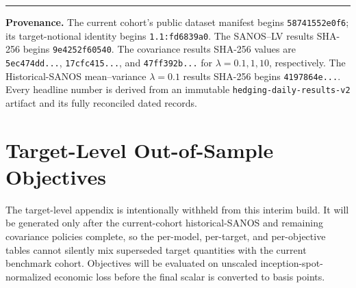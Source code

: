 \documentclass[10pt]{article}
\begin{document}
\vspace{0.4em}
\hrule
\vspace{0.35em}
{\footnotesize
\textbf{Provenance.}
The current cohort's public dataset manifest begins \texttt{58741552e0f6};
its target-notional identity begins \texttt{1.1:fd6839a0}. The SANOS--LV
results SHA-256 begins \texttt{9e4252f60540}.
The covariance results SHA-256 values are
\texttt{5ec474dd...}, \texttt{17cfc415...}, and \texttt{47ff392b...} for
$\lambda=0.1,1,10$, respectively. The Historical-SANOS mean--variance
$\lambda=0.1$ results SHA-256 begins \texttt{4197864e...}. Every headline number is derived from an
immutable \texttt{hedging-daily-results-v2} artifact and its fully reconciled
dated records.}

\clearpage
\appendix
\section{Target-Level Out-of-Sample Objectives}
\label{app:target-objectives}

The target-level appendix is intentionally withheld from this interim build.
It will be generated only after the current-cohort historical-SANOS and
remaining covariance policies complete, so the per-model, per-target, and
per-objective tables cannot silently mix superseded target quantities with the
current benchmark cohort. Objectives will be evaluated on unscaled
inception-spot-normalized economic loss before the final scalar is converted to
basis points.

\clearpage


\end{document}
